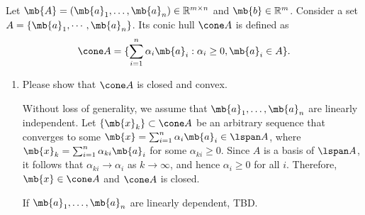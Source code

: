 \begin{exercise}
  Let $\mb{A}=(\mb{a}_1,\dots,\mb{a}_n)\in \mathbb{R}^{m\times n}$ and $\mb{b}\in\mathbb{R}^m$. Consider a set $A=\{ \mb{a}_1,\cdots ,\mb{a}_n\}$. Its conic hull $\cone A$ is defined as
  $$
    \cone A=\{ \sum_{i=1}^n\alpha_i\mb{a}_i:\alpha_i\ge 0,\mb{a}_i\in A\}.
  $$
  \begin{enumerate}
    \item
      Please show that $\cone A$ is closed and convex.
      \begin{solution}
        Without loss of generality, we assume that $\mb{a}_1, \dots, \mb{a}_n$ are linearly independent. Let $\{\mb{x}_k\} \subset \cone A$ be an arbitrary sequence that converges to some $\mb{x} = \sum_{i=1}^n\alpha_i\mb{a}_i\in \lspan A$, where $\mb{x}_k=\sum_{i=1}^n\alpha_{ki}\mb{a}_i$ for some $\alpha_{ki}\ge 0$. Since $A$ is a basis of $\lspan A$, it follows that $\alpha_{ki}\to \alpha_i$ as $k\to\infty$, and hence $\alpha_i \ge 0$ for all $i$. Therefore, $\mb{x} \in \cone A$ and $\cone A$ is closed.

        If $\mb{a}_1, \dots, \mb{a}_n$ are linearly dependent, TBD.
        

\end{solution}
\end{enumerate}
\end{exercise}
